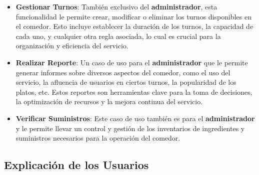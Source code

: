 \documentclass[12pt]{article}
\begin{document}
\begin{itemize}
	\item \textbf{Gestionar Turnos}: También exclusivo del \textbf{administrador}, esta funcionalidad le permite crear, modificar o eliminar los turnos disponibles en el comedor. Esto incluye establecer la duración de los turnos, la capacidad de cada uno, y cualquier otra regla asociada, lo cual es crucial para la organización y eficiencia del servicio.

	\item \textbf{Realizar Reporte}: Un caso de uso para el \textbf{administrador} que le permite generar informes sobre diversos aspectos del comedor, como el uso del servicio, la afluencia de usuarios en ciertos turnos, la popularidad de los platos, etc. Estos reportes son herramientas clave para la toma de decisiones, la optimización de recursos y la mejora continua del servicio.

	\item \textbf{Verificar Suministros}: Este caso de uso también es para el \textbf{administrador} y le permite llevar un control y gestión de los inventarios de ingredientes y suministros necesarios para la operación del comedor.
\end{itemize}

\pagebreak

\subsection*{Explicación de los Usuarios}
\end{document}

